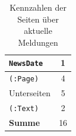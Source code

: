 \begin{table}[htb]
\begin{subtable}[c]{0.5\textwidth}
\begin{tabular}{|l|c|}
                \texttt{NewsDate}        & 1                                    \\ \hline
                \texttt{(:Page)}          & 4                                    \\ \hline
                Unterseiten     & 5                                    \\ \hline
                \texttt{(:Text)}           & 2                                    \\ \hline
                \textbf{Summe}  & 16                                   \\ \hline
                \end{tabular}
            \label{table:findingsNewsFiguresSharedNodes}
        \end{subtable}
        \label{table:findingsNewsFigures}
        \caption{Kennzahlen der Seiten über aktuelle Meldungen}
    \end{table}
